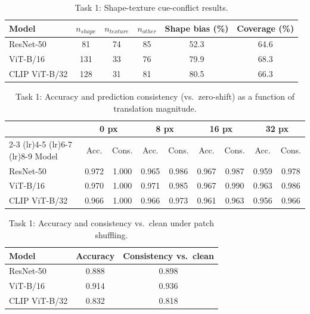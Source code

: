 \documentclass{article}
\begin{document}
\begin{table}[h]
\centering
\caption{Task 1: Shape-texture cue-conflict results. }
\label{tab:t1-shape-texture}
\begin{tabular}{lccccc}
\toprule
Model & \(n_{shape}\) & \(n_{texture}\) & \(n_{other}\) & Shape bias (\%) & Coverage (\%) \\
\midrule
ResNet-50     & 81  & 74 & 85 & 52.3 & 64.6 \\
ViT-B/16       & 131 & 33 & 76 & 79.9 & 68.3 \\
CLIP ViT-B/32  & 128 & 31 & 81 & 80.5 & 66.3 \\
\bottomrule
\end{tabular}
\end{table}


\begin{table}[h]
\centering
\caption{Task 1: Accuracy and prediction consistency (vs.\ zero-shift) as a function of translation magnitude.}
\label{tab:t1-translation}
\begin{tabular}{lcccccccc}
\toprule
 & \multicolumn{2}{c}{0 px} & \multicolumn{2}{c}{8 px} & \multicolumn{2}{c}{16 px} & \multicolumn{2}{c}{32 px} \\
\cmidrule(lr){2-3} \cmidrule(lr){4-5} \cmidrule(lr){6-7} \cmidrule(lr){8-9}
Model & Acc. & Cons. & Acc. & Cons. & Acc. & Cons. & Acc. & Cons. \\
\midrule
ResNet-50     & 0.972 & 1.000 & 0.965 & 0.986 & 0.967 & 0.987 & 0.959 & 0.978 \\
ViT-B/16       & 0.970 & 1.000 & 0.971 & 0.985 & 0.967 & 0.990 & 0.963 & 0.986 \\
CLIP ViT-B/32  & 0.966 & 1.000 & 0.966 & 0.973 & 0.961 & 0.963 & 0.956 & 0.966 \\
\bottomrule
\end{tabular}
\end{table}


\begin{table}[h]
\centering
\caption{Task 1: Accuracy and consistency vs.\ clean under patch shuffling.}
\label{tab:t1-patch-shuffle}
\begin{tabular}{lcc}
\toprule
Model & Accuracy & Consistency vs.\ clean \\
\midrule
ResNet-50     & 0.888 & 0.898 \\
ViT-B/16       & 0.914 & 0.936 \\
CLIP ViT-B/32  & 0.832 & 0.818 \\
\bottomrule
\end{tabular}
\end{table}
\end{document}
